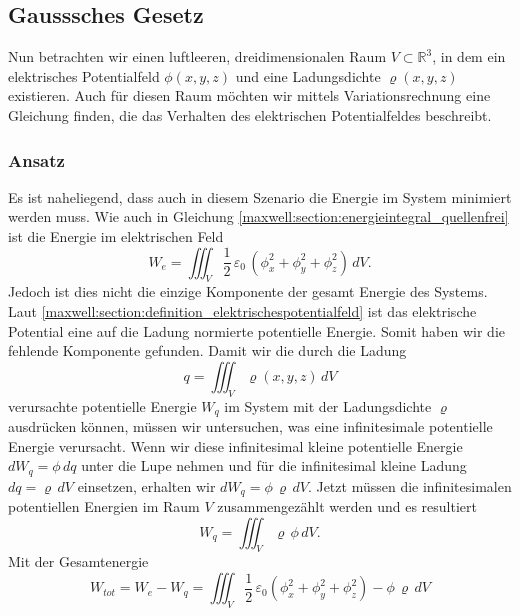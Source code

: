 %
%
%
%
\subsection{Gausssches Gesetz
\label{maxwell:section:elektrostatik_mit_quelle}}
Nun betrachten wir einen luftleeren, dreidimensionalen Raum $V\subset\mathbb{R}^3$, in dem ein elektrisches Potentialfeld $\phi(x,y,z)$ und eine Ladungsdichte $\varrho(x,y,z)$ existieren.
Auch für diesen Raum möchten wir mittels Variationsrechnung eine Gleichung finden, die das Verhalten des elektrischen Potentialfeldes beschreibt.

\subsubsection{Ansatz}
Es ist naheliegend, dass auch in diesem Szenario die Energie im System minimiert werden muss.
Wie auch in Gleichung \eqref{maxwell:section:energieintegral_quellenfrei} ist die Energie im elektrischen Feld
\[
W_e
=
\iiint_V \frac{1}{2}\,\varepsilon_0\,(\phi_x^2 + \phi_y^2 + \phi_z^2)\, dV.
\]
Jedoch ist dies nicht die einzige Komponente der gesamt Energie des Systems.
Laut \eqref{maxwell:section:definition_elektrischespotentialfeld} ist das elektrische Potential eine auf die Ladung normierte potentielle Energie.
Somit haben wir die fehlende Komponente gefunden.
Damit wir die durch die Ladung
\begin{equation}
q
=
\iiint_V \varrho(x,y,z)\, dV
\label{maxwell:ladung}
\end{equation}
verursachte potentielle Energie $W_q$ im System mit der Ladungsdichte $\varrho$ ausdrücken können, müssen wir untersuchen, was eine infinitesimale potentielle Energie verursacht.
Wenn wir diese infinitesimal kleine potentielle Energie
\(
dW_q
=
\phi\, dq
\)
unter die Lupe nehmen und für die infinitesimal kleine Ladung
\(
dq
=
\varrho\, dV
\)
einsetzen, erhalten wir
\(
dW_q
=
\phi\,\varrho\, dV.
\)
Jetzt müssen die infinitesimalen potentiellen Energien im Raum $V$ zusammengezählt werden und es resultiert
\begin{equation}
W_q
=
\iiint_V \varrho\,\phi\, dV.
\label{maxwell:section:potenzielle_energie_ladung}
\end{equation}
Mit der Gesamtenergie
\[
W_{tot}
=
W_e - W_q
=
\iiint_V \frac{1}{2}\,\varepsilon_0\left(\phi_x^2 + \phi_y^2 + \phi_z^2\right) - \phi\,\varrho\, dV
\]
